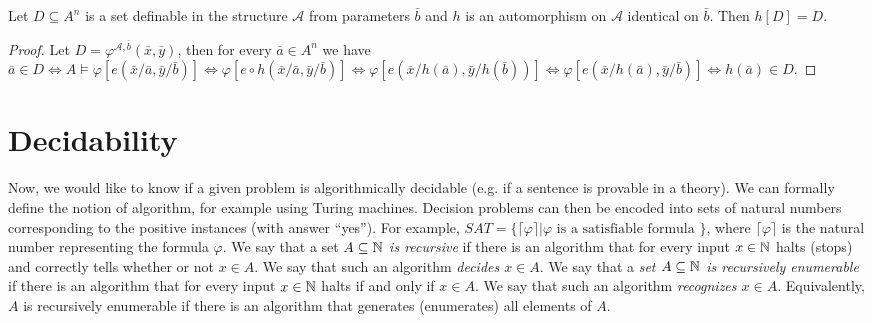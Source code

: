 \begin{lemma}
Let $D \subseteq A^n$ is a set definable in the structure $\mathcal{A}$ from parameters $\bar{b}$ and $h$ is an automorphism on $\mathcal{A}$ identical on $\bar{b}$. Then $h[D] = D$.
\end{lemma}
\begin{proof}
Let $D = \varphi^{\mathcal{A}, \bar{b}}(\bar{x}, \bar{y})$, then for every $\bar{a} \in A^n$ we have $\bar{a} \in D \Leftrightarrow A \vDash \varphi[e(\bar{x}/\bar{a}, \bar{y}/\bar{b})] \Leftrightarrow \varphi[e \circ h(\bar{x}/\bar{a}, \bar{y}/\bar{b})] \Leftrightarrow \varphi[e(\bar{x}/h(\bar{a}), \bar{y}/h(\bar{b}))] \Leftrightarrow \varphi[e(\bar{x}/h(\bar{a}), \bar{y}/\bar{b})] \Leftrightarrow h(\bar{a}) \in D$.
\end{proof}

\section{Decidability}

Now, we would like to know if a given problem is algorithmically decidable (e.g. if a sentence is provable in a theory). We can formally define the notion of algorithm, for example using Turing machines. Decision problems can then be encoded into sets of natural numbers corresponding to the positive instances (with answer ``yes''). For example, $SAT = \{\lceil \varphi \rceil | \varphi \text{ is a satisfiable formula }\}$, where $\lceil \varphi \rceil$ is the natural number representing the formula $\varphi$. We say that a set \emph{$A \subseteq \mathbb{N}$ is recursive} if there is an algorithm that for every input $x \in \mathbb{N}$ halts (stops) and correctly tells whether or not $x \in A$. We say that such an algorithm \emph{decides $x \in A$}. We say that a \emph{set $A \subseteq \mathbb{N}$ is recursively enumerable} if there is an algorithm that for every input $x \in \mathbb{N}$ halts if and only if $x \in A$. We say that such an algorithm \emph{recognizes $x \in A$}. Equivalently, $A$ is recursively enumerable if there is an algorithm that generates (enumerates) all elements of $A$. 


